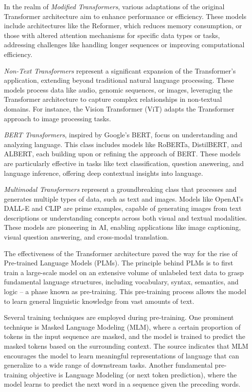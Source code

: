 In the realm of \textit{Modified Transformers}, various adaptations of the original Transformer architecture aim to enhance performance or efficiency. These models include architectures like the Reformer, which reduces memory consumption, or those with altered attention mechanisms for specific data types or tasks, addressing challenges like handling longer sequences or improving computational efficiency.

\textit{Non-Text Transformers} represent a significant expansion of the Transformer's application, extending beyond traditional natural language processing. These models process data like audio, genomic sequences, or images, leveraging the Transformer architecture to capture complex relationships in non-textual domains. For instance, the Vision Transformer (ViT) adapts the Transformer approach to image processing tasks.

\textit{BERT Transformers}, inspired by Google's BERT, focus on understanding and analyzing language. This class includes models like RoBERTa, DistilBERT, and ALBERT, each building upon or refining the approach of BERT. These models are particularly effective in tasks like text classification, question answering, and language inference, offering deep contextual insights into language.

\textit{Multimodal Transformers} represent a groundbreaking class that processes and generates multiple types of data, such as text and images. Models like OpenAI’s DALL-E and CLIP are prime examples, capable of generating images from text descriptions or understanding concepts across both visual and textual modalities. These models are pioneering in AI, enabling applications like image captioning, visual question answering, and cross-modal translation.

The effectiveness of the Transformer architecture paved the way for the rise of Pre-trained Language Models (PLMs). The principle behind PLMs is to first train a large-scale model on an extensive volume of unlabeled text data to grasp fundamental language structures, including vocabulary, syntax, semantics, and logic – a phase known as pre-training. This pre-training process allows the model to learn general linguistic knowledge from vast amounts of text.

Several training techniques are employed during pre-training. One prominent technique is Masked Language Modeling (MLM), where a certain proportion of tokens in the input sequence are masked, and the model is trained to predict the masked tokens based on the surrounding context. The source indicates that MLM encourages the model to learn meaningful representations of language that can generalize to a wide range of downstream tasks. Another fundamental pre-training objective is Language Modeling (or next token prediction), where the model learns to predict the next word in a sequence given the preceding words.

